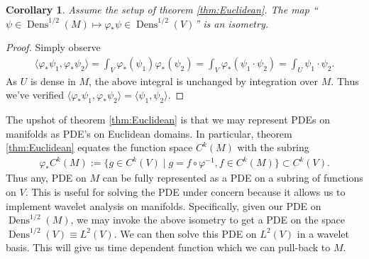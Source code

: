 \documentclass[letterpaper, 12 pt]{amsart}
\newcommand{\R}{\mathbb{R}}
\newtheorem{thm}{Theorem}[section]
\newtheorem{cor}[thm]{Corollary}
\DeclareMathOperator{\Dens}{Dens}
\begin{document}
  \begin{cor}
    Assume the setup of theorem \ref{thm:Euclidean}.
    The map 
    ``$\psi \in \Dens^{1/2}(M) \mapsto \varphi_* \psi \in \Dens^{1/2}(V)$''
    is an isometry.
  \end{cor}
  \begin{proof}
    Simply observe
    \begin{align*}
      \langle \varphi_*\psi_1 , \varphi_*\psi_2 \rangle
      = \int_V \varphi_*(\psi_1) \varphi_*(\psi_2) 
      = \int_V \varphi_*( \psi_1 \cdot \psi_2) 
      = \int_U \psi_1 \cdot \psi_2.
    \end{align*}
    As $U$ is dense in $M$, the above integral is unchanged by integration
    over $M$.   Thus we've verified $\langle \varphi_* \psi_1,\varphi_*\psi_2 \rangle = \langle \psi_1,\psi_2 \rangle$.
  \end{proof}

  The upshot of theorem \ref{thm:Euclidean} is that we may represent PDEs on manifolds
  as PDE's on Euclidean domains.
  In particular, theorem \ref{thm:Euclidean} equates the function
  space $C^k(M)$ with the subring
  \begin{align*}
    \varphi_*C^k(M) := \{ g \in C^k(V) \mid g = f \circ \varphi^{-1} , f \in C^k(M) \} \subset C^k(V).
  \end{align*}
  Thus any, PDE on $M$ can be fully represented as a PDE on a 
  subring of functions on $V$.
  This is useful for solving the PDE under concern because it allows
  us to implement wavelet analysis on manifolds.
  Specifically, given our PDE on $\Dens^{1/2}(M)$,
  we may invoke the above isometry to get a PDE
  on the space $\Dens^{1/2}(V) \equiv L^2(V)$.
  We can then solve this PDE on $L^2(V)$ in a wavelet
  basis.  This will give us time dependent 
  function which we can pull-back to $M$.

\end{document}
